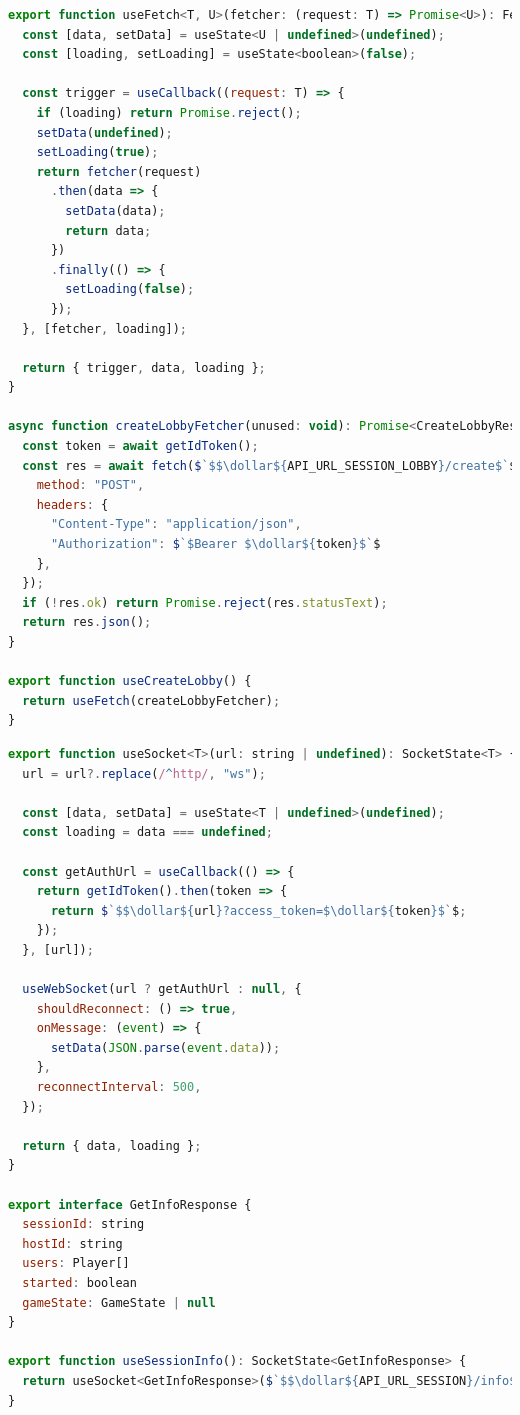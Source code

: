 \begin{lstlisting}[language=JavaScript, caption=Hooki z Fetch API, label={lst:fetch-hooks}, captionpos=b]
export function useFetch<T, U>(fetcher: (request: T) => Promise<U>): FetchState<T, U> {
  const [data, setData] = useState<U | undefined>(undefined);
  const [loading, setLoading] = useState<boolean>(false);

  const trigger = useCallback((request: T) => {
    if (loading) return Promise.reject();
    setData(undefined);
    setLoading(true);
    return fetcher(request)
      .then(data => {
        setData(data);
        return data;
      })
      .finally(() => {
        setLoading(false);
      });
  }, [fetcher, loading]);

  return { trigger, data, loading };
}

async function createLobbyFetcher(unused: void): Promise<CreateLobbyResponse> {
  const token = await getIdToken();
  const res = await fetch($`$$\dollar${API_URL_SESSION_LOBBY}/create$`$, {
    method: "POST",
    headers: {
      "Content-Type": "application/json",
      "Authorization": $`$Bearer $\dollar${token}$`$
    },
  });
  if (!res.ok) return Promise.reject(res.statusText);
  return res.json();
}

export function useCreateLobby() {
  return useFetch(createLobbyFetcher);
}
\end{lstlisting}

\vspace*{0.5cm}

\begin{lstlisting}[language=JavaScript, caption=Hooki z WebSocketem, label={lst:websocket-hooks}, captionpos=b]
export function useSocket<T>(url: string | undefined): SocketState<T> {
  url = url?.replace(/^http/, "ws");

  const [data, setData] = useState<T | undefined>(undefined);
  const loading = data === undefined;

  const getAuthUrl = useCallback(() => {
    return getIdToken().then(token => {
      return $`$$\dollar${url}?access_token=$\dollar${token}$`$;
    });
  }, [url]);

  useWebSocket(url ? getAuthUrl : null, {
    shouldReconnect: () => true,
    onMessage: (event) => {
      setData(JSON.parse(event.data));
    },
    reconnectInterval: 500,
  });

  return { data, loading };
}  

export interface GetInfoResponse {
  sessionId: string
  hostId: string
  users: Player[]
  started: boolean
  gameState: GameState | null
}

export function useSessionInfo(): SocketState<GetInfoResponse> {
  return useSocket<GetInfoResponse>($`$$\dollar${API_URL_SESSION}/info$`$);
}

\end{lstlisting}

